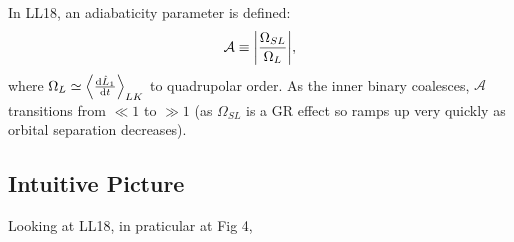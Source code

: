 \documentclass[11pt,
        usenames, %
        dvipsnames %
    ]{article}
\newcommand*{\rd}[2]{\frac{\mathrm{d}#1}{\mathrm{d}#2}}
\DeclarePairedDelimiter\abs{\lvert}{\rvert}
\DeclarePairedDelimiter\ev{\langle}{\rangle}
\begin{document}
In LL18, an adiabaticity parameter is defined:
\begin{equation}
    \mathcal{A} \equiv \abs*{\frac{\Omega_{SL}}{\Omega_L}},
\end{equation}
where $\Omega_{L} \simeq \ev*{\rd{\hat{L}_1}{t}}_{LK}$ to quadrupolar order. As
the inner binary coalesces, $\mathcal{A}$ transitions from $\ll 1$ to $\gg 1$
(as $\Omega_{SL}$ is a GR effect so ramps up very quickly as orbital separation
decreases).

\subsection{Intuitive Picture}

Looking at LL18, in praticular at Fig 4,
\end{document}
